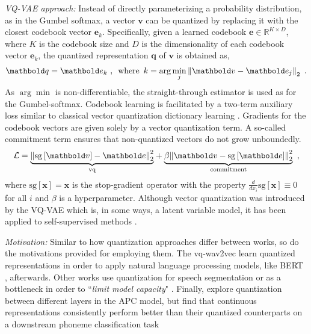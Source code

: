 {\textit{VQ-VAE approach:} Instead of directly parameterizing a probability distribution, as in the Gumbel softmax, a vector $\mathbf{v}$ can be quantized by replacing it with the closest codebook vector $\mathbf{e}_k$. Specifically, given a learned codebook $\mathbf{e}\in\mathbb{R}^{K\times D}$, where $K$ is the codebook size and $D$ is the dimensionality of each codebook vector $\mathbf{e}_k$, the quantized representation $\mathbf{q}$ of $\mathbf{v}$ is obtained as,
\begin{align}
    \mathbf{q} = \mathbf{e}_k \ , \enspace \text{where} \enspace k=\arg\min_j \norm{\mathbf{v} - \mathbf{e}_j}_2 \enspace .
\end{align}
As $\arg\min$ is non-differentiable, the straight-through estimator is used as for the Gumbel-softmax. 
Codebook learning is facilitated by a two-term auxiliary loss similar to classical vector quantization dictionary learning \cite{burton_generalization_1983, soong_vector_1985}. Gradients for the codebook vectors are given solely by a vector quantization term. A so-called commitment term ensures that non-quantized vectors do not grow unboundedly.
\begin{align}
    \mathcal{L} = \underset{\text{vq}}{\underbrace{\norm{\text{sg}\left[\mathbf{v}\right] - \mathbf{e}}_2^2}} + \underset{\text{commitment}}{\underbrace{\beta\norm{\mathbf{v} - \text{sg}\left[\mathbf{e}\right]}_2^2}} \enspace , \label{eq_brief: vector quantization losses}
\end{align}
where $\text{sg}[\mathbf{x}] = \mathbf{x}$ is the stop-gradient operator with the property $\frac{d}{dx_i}\text{sg}[\mathbf{x}] \equiv 0$ for all $i$ and $\beta$ is a hyperparameter. Although vector quantization was introduced by the VQ-VAE which is, in some ways, a latent variable model, it has been applied to self-supervised methods \cite{vanniekerk_vectorquantized_2020, baevski_vqwav2vec_2020}.

\textit{Motivation:} Similar to how quantization approaches differ between works, so do the motivations provided for employing them. The vq-wav2vec \cite{baevski_vqwav2vec_2020, baevski_effectiveness_2020} learn quantized representations in order to apply natural language processing models, like BERT \cite{devlin_bert_2018}, afterwards. Other works use quantization for speech segmentation \cite{kamper_unsupervised_2021, chorowski_unsupervised_2019} or as a bottleneck in order to ``\textit{limit model capacity}" \cite{chung_vectorquantized_2020, ling_decoar_2020}.
Finally, \citet{chung_vectorquantized_2020} explore quantization between different layers in the APC model, but find that continuous representations consistently perform better than their quantized counterparts on a downstream phoneme classification task

}
